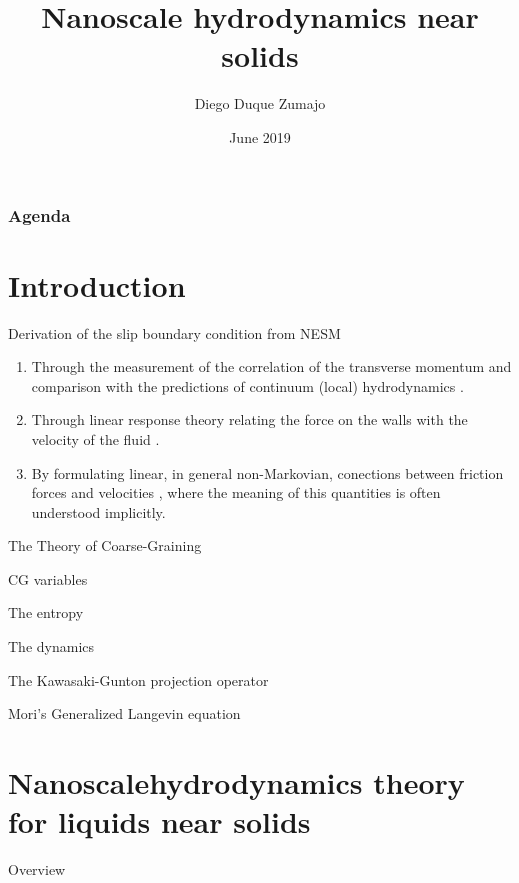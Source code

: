 \documentclass{beamer}
\title{Nanoscale hydrodynamics near solids}
\date{June 2019}
\author{Diego Duque Zumajo}
\institute{Departamento Física Fundamental \\Universidad Nacional de Educación a Distancia}
\begin{document}
\maketitle

\begin{frame}
\frametitle{Agenda}
\tableofcontents
\end{frame}


\section{Introduction}
\begin{frame}{Derivation of the slip boundary condition from NESM}
\begin{enumerate}
\item Through the  measurement of the correlation of
the  transverse  momentum  and  comparison  with  the  predictions  of
continuum  (local) hydrodynamics  \cite{Bocquet1993,Chen2015}.
\item Through
linear  response theory  relating  the  force on  the  walls with  the
velocity   of  the   fluid   \cite{Bocquet1993,Petravic2007}.
\item By formulating  linear,  in  general  non-Markovian,  conections  between
friction forces and velocities \cite{Hansen2011}, where the meaning of
this quantities is often understood implicitly.
\end{enumerate}
\end{frame}

\begin{frame}{The Theory of Coarse-Graining}
\end{frame}

\begin{frame}{CG variables}
\end{frame}

\begin{frame}{The entropy}
\end{frame}

\begin{frame}{The dynamics}
\end{frame}

\begin{frame}{The Kawasaki-Gunton projection operator}
\end{frame}

\begin{frame}{Mori's Generalized Langevin equation}
\end{frame}

\section{Nanoscalehydrodynamics theory for liquids near solids}
\begin{frame}{Overview}
\end{frame}
\end{document}
